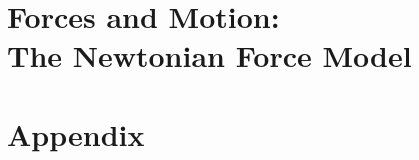 \documentclass[12pt,onecolumn,letterpaper]{book}
\newcommand{\FModel}{\textbf{Newtonian Force Model}}
\begin{document}
	
	\label{Unit7}

\part[Forces and Motion: Newton's Laws]{Forces and Motion:\\ The \FModel{}}
	
	\label{Unit8}


%
%

\cleardoublepage		%
\appendix

\part*{Appendix}

\fancyhead[LE,RO]{\sc\nouppercase{\leftmark}}
\fancyhead[RE,LO]{\sc\nouppercase{\rightmark}}

\renewcommand{\thepage}{\thechapter-\arabic{page}}
\newcommand{\appendixchapter}[1]{\chapter{#1}\setcounter{page}{1}}








\iftoggle{instructor}{
	
	
	}
	{}
\end{document}
